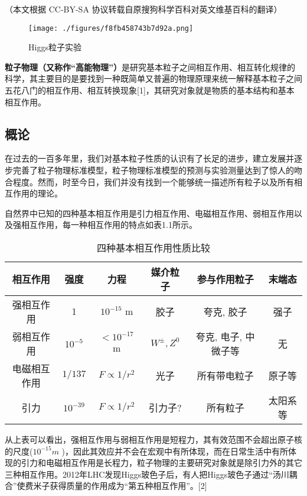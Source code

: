 
（本文根据 CC-BY-SA 协议转载自原搜狗科学百科对英文维基百科的翻译）

\begin{figure}[ht]
\centering
\texttt{[image: ./figures/f8fb458743b7d92a.png]}
\caption{Higgs粒子实验} \label{fig_LZWLX_2}
\end{figure}

\textbf{粒子物理（又称作“高能物理”）}是研究基本粒子之间相互作用、相互转化规律的科学，其主要目的是要找到一种既简单又普遍的物理原理来统一解释基本粒子之间五花八门的相互作用、相互转换现象[1]，其研究对象就是物质的基本结构和基本相互作用。

\subsection{概论}
在过去的一百多年里，我们对基本粒子性质的认识有了长足的进步，建立发展并逐步完善了粒子物理标准模型，粒子物理标准模型的预测与实验测量达到了惊人的吻合程度。然而，时至今日，我们并没有找到一个能够统一描述所有粒子以及所有相互作用的理论。

自然界中已知的四种基本相互作用是引力相互作用、电磁相互作用、弱相互作用以及强相互作用，每一种相互作用的特点如表1.1所示。
\begin{table}[h]
\centering
\caption{四种基本相互作用性质比较}
\begin{tabular}{|c|c|c|c|c|c|}
\hline
\textbf{相互作用} & \textbf{强度} & \textbf{力程} & \textbf{媒介粒子} & \textbf{参与作用粒子} & \textbf{末端态 }\\
\hline
强相互作用 & 1 & $10^{-15}$ m & 胶子 & 夸克, 胶子 & 强子 \\
\hline
弱相互作用 & $10^{-5}$ & $<10^{-17}$ m & $W^{\pm}, Z^0$ & 夸克, 电子, 中微子等 & 无 \\
\hline
电磁相互作用 & $1/137$ & $F \propto 1/r^2$ & 光子 & 所有带电粒子 & 原子等 \\
\hline
引力 & $10^{-39}$ & $F \propto 1/r^2$ & 引力子? & 所有粒子 & 太阳系等 \\
\hline
\end{tabular}
\end{table}
从上表可以看出，强相互作用与弱相互作用是短程力，其有效范围不会超出原子核的尺度($10^{-15} m$ )，因此其效应并不会在宏观中有所体现，而在日常生活中有所体现的引力和电磁相互作用是长程力，粒子物理的主要研究对象就是除引力外的其它三种相互作用。2012年LHC发现Higgs玻色子后，有人把Higgs玻色子通过“汤川耦合”使费米子获得质量的作用成为“第五种相互作用”。[2]

